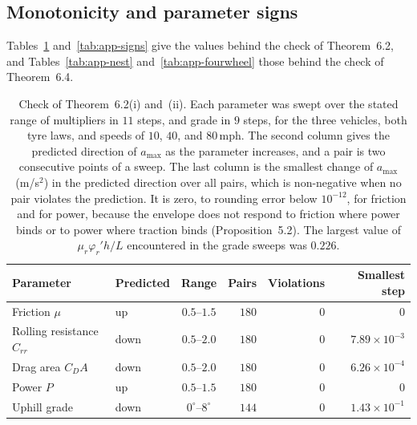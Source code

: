 \documentclass[12pt, twoside]{amsart}
\theoremstyle{definition}
\newcommand{\amax}{a_{\max}}
\newcommand{\mainref}[2]{#2}
\begin{document}
\subsection{Monotonicity and parameter signs}

Tables~\ref{tab:app-mono} and~\ref{tab:app-signs} give the values behind the check of
Theorem~\mainref{thm:signtable}{6.2}, and Tables~\ref{tab:app-nest} and~\ref{tab:app-fourwheel} those behind
the check of Theorem~\mainref{thm:fourwheel}{6.4}.

\begin{table}[htbp]
\centering\small
\setlength{\tabcolsep}{5pt}
\caption{Check of Theorem~\mainref{thm:signtable}{6.2}\mainref{sg:mono}{{(i)}} and~\mainref{sg:grade}{{(ii)}}. Each parameter was swept over the stated range of multipliers in $11$ steps, and grade in $9$ steps, for the three vehicles, both tyre laws, and speeds of $10$, $40$, and $80$\,mph. The second column gives the predicted direction of $\amax$ as the parameter increases, and a pair is two consecutive points of a sweep. The last column is the smallest change of $\amax$ (m/s$^2$) in the predicted direction over all pairs, which is non-negative when no pair violates the prediction. It is zero, to rounding error below $10^{-12}$, for friction and for power, because the envelope does not respond to friction where power binds or to power where traction binds (Proposition~\mainref{prop:regimes}{5.2}). The largest value of $\mu_r\varphi_r'h/L$ encountered in the grade sweeps was $0.226$.}\label{tab:app-mono}
\begin{tabular}{llcrrr}
\toprule
Parameter & Predicted & Range & Pairs & Violations & Smallest step\\
\midrule
Friction $\mu$ & up & $0.5$--$1.5$ & $180$ & $0$ & $0$\\
Rolling resistance $C_{rr}$ & down & $0.5$--$2.0$ & $180$ & $0$ & $7.89\times10^{-3}$\\
Drag area $C_DA$ & down & $0.5$--$2.0$ & $180$ & $0$ & $6.26\times10^{-4}$\\
Power $P$ & up & $0.5$--$1.5$ & $180$ & $0$ & $0$\\
Uphill grade & down & $0^\circ$--$8^\circ$ & $144$ & $0$ & $1.43\times10^{-1}$\\
\bottomrule
\end{tabular}
\end{table}
\end{document}
